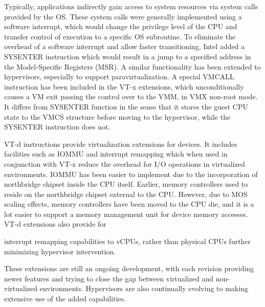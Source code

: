 Typically, applications indirectly gain access to system resources via system calls provided by the OS. These system calls were generally implemented using a software interrupt, which would change the privilege level of the CPU and transfer control of execution to a specific OS subroutine. To eliminate the overhead of a software interrupt and allow faster transitioning, Intel added a SYSENTER instruction which would result in a jump to a specified address in the Model-Specific Registers (MSR). A similar functionality has been extended to hypervisors, especially to support paravirtualization. A special VMCALL instruction has been included in the VT-x extensions, which unconditionally causes a VM exit passing the control over to the VMM, in VMX non-root mode. It differs from SYSENTER function in the sense that it stores the guest CPU state to the VMCS structure before moving to the hypervisor, while the SYSENTER instruction does not.

VT-d instructions provide virtualization extensions for devices. It includes facilities such as IOMMU and interrupt remapping which when used in conjunction with VT-x reduce the overhead for I/O operations in virtualized environments. IOMMU has been easier to implement due to the incorporation of northbridge chipset inside the CPU itself. Earlier, memory controllers used to reside on the northbridge chipset external to the CPU. However, due to MOS scaling effects, memory controllers have been moved to the CPU die, and it is a lot easier to support a memory management unit for device memory accesses. VT-d extensions also provide for

interrupt remapping capabilities to vCPUs, rather than physical CPUs further minimizing hypervisor intervention.

These extensions are still an ongoing development, with each revision providing newer features and trying to close the gap between virtualized and non-virtualized environments. Hypervisors are also continually evolving to making extensive use of the added capabilities. 
